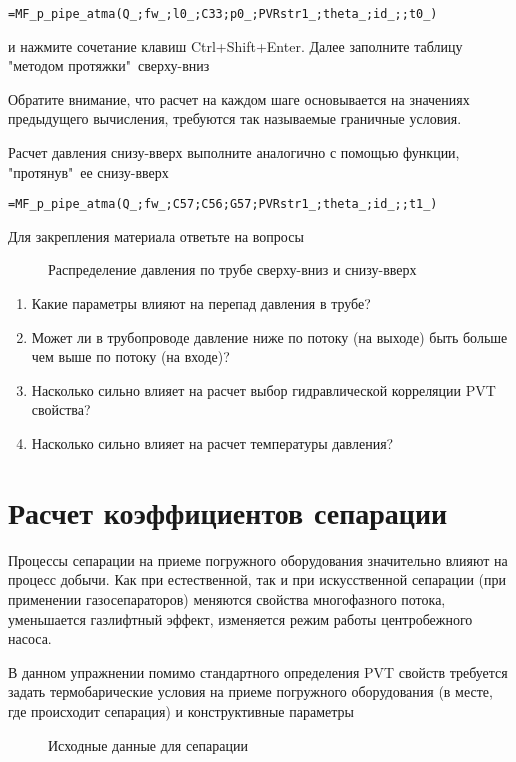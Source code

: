 { \small  \texttt{=MF\_p\_pipe\_atma(Q\_;fw\_;l0\_;C33;p0\_;PVRstr1\_;theta\_;id\_;;t0\_)
}}

и нажмите сочетание клавиш Ctrl+Shift+Enter. Далее заполните таблицу "методом протяжки"\ сверху-вниз

Обратите внимание, что расчет на каждом шаге основывается на значениях предыдущего вычисления, требуются так называемые граничные условия. 

Расчет давления снизу-вверх выполните аналогично с помощью функции, "протянув"\ ее снизу-вверх

{ \small  \texttt{=MF\_p\_pipe\_atma(Q\_;fw\_;C57;C56;G57;PVRstr1\_;theta\_;id\_;;t1\_)
}}

Для закрепления материала ответьте на вопросы

\begin{figure}[h!]
	\center{\texttt{[image: Ex50\_2]}}
	\caption{Распределение давления по трубе сверху-вниз и снизу-вверх}
	\label{ris:Ex50_2}
\end{figure}

\begin{enumerate}
	\item Какие параметры влияют на перепад давления в трубе?
	\item Может ли в трубопроводе давление ниже по потоку (на выходе) быть больше чем выше по потоку (на входе)?
	\item Насколько сильно влияет на расчет выбор гидравлической корреляции PVT свойства?
	\item Насколько сильно влияет на расчет температуры давления?
\end{enumerate}

\section{Расчет коэффициентов сепарации}

Процессы сепарации на приеме погружного оборудования значительно влияют на процесс добычи. Как при естественной, так и при искусственной сепарации (при применении газосепараторов) меняются свойства многофазного потока, уменьшается газлифтный эффект, изменяется режим работы центробежного насоса.

В данном упражнении помимо стандартного определения PVT свойств требуется задать термобарические условия на приеме погружного оборудования (в месте, где происходит сепарация) и конструктивные параметры


\begin{figure}[h!]
	\center{\texttt{[image: Ex60\_1]}}
	\caption{Исходные данные для сепарации}
	\label{ris:Ex60_1}
\end{figure}

